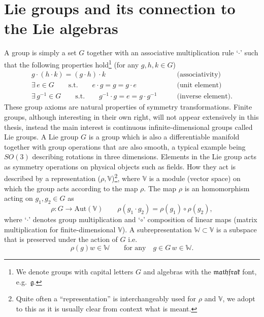 \documentclass[11pt]{report}
\begin{document}
\section{Lie groups and its connection to the Lie algebras}\label{sec:groups}
A group is simply a set $G$ together with an associative multiplication rule `$\cdot$' such that the following properties hold\footnote{We denote groups with capital letters $G$ and algebras with the $\mathfrak{mathfrak}$ font, e.g.\ $\mathfrak{g}$.} (for any $g,h,k\in G$)
\begin{align*}
    g\cdot \left(h\cdot k\right) = \left(g\cdot h\right)\cdot k \qquad &\text{(associativity)}\\
    \exists\, e \in G \qquad \text{s.t.} \qquad e\cdot g = g = g \cdot e\qquad &\text{(unit element)}\\
    \exists\, g^{-1}\in G\qquad \text{s.t.}\qquad g^{-1}\cdot g = e = g\cdot g^{-1} \qquad &\text{(inverse element)}.
\end{align*}
These group axioms are natural properties of symmetry transformations. Finite groups, although interesting in their own right, will not appear extensively in this thesis, instead the main interest is continuous infinite-dimensional groups called Lie groups. A Lie group $G$ is a group which is also a differentiable manifold together with group operations that are also smooth, a typical example being $SO(3)$ describing rotations in three dimensions. Elements in the Lie group acts as symmetry operations on physical objects such as fields. How they act is described by a representation ($\rho,\mathbb{V}$)\footnote{Quite often a ``representation'' is interchangeably used for $\rho$ and $\mathbb{V}$, we adopt to this as it is usually clear from context what is meant.}, where $\mathbb{V}$ is a module (vector space) on which the group acts according to the map $\rho$. The map $\rho$ is an homomorphism acting on $g_1,g_2\in G$ as
\begin{equation}
    \rho : G\to \text{Aut}(\mathbb{V}) \qquad \rho(g_1\cdot g_2) = \rho(g_1)\circ\rho(g_2),
\end{equation}
where `$\cdot$' denotes group multiplication and `$\circ$' composition of linear maps (matrix multiplication for finite-dimensional $\mathbb{V}$). A subrepresentation $\mathbb{W}\subset\mathbb{V}$ is a subspace that is preserved under the action of $G$ i.e.\
\begin{equation}
    \rho(g)w \in \mathbb{W} \qquad \text{for any} \quad g\in G\, w\in\mathbb{W}.
\end{equation}
\end{document}
